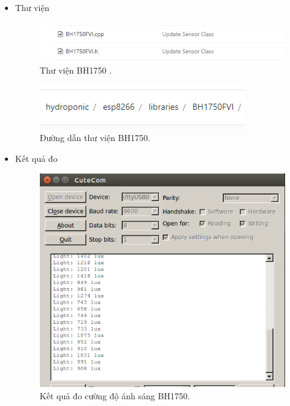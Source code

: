 \documentclass[a4paper,12pt,oneside]{article}
\begin{document}
\begin{enumerate}
\begin{itemize}
			\item Thư viện
			
			\begin{figure}[H]
			\centering
			\begin{center}
			\includegraphics[scale=.7]{hinh/lib_light.PNG}
			\end{center}
			\caption{Thư viện BH1750 .}
			\end{figure}
			
			\begin{figure}[H]
			\centering
			\begin{center}
			\includegraphics[scale=.7]{hinh/path_light.PNG}
			\end{center}
			\caption{Đường dẫn thư viện BH1750.}
			\end{figure}
			
			\item Kết quả đo
			
			\begin{figure}[H]
			\centering
			\begin{center}
			\includegraphics[scale=.6]{hinh/result_light.PNG}
			\end{center}
			\caption{Kết quả đo cường độ ánh sáng BH1750.}
			\end{figure}
		

\end{itemize}
\end{enumerate}
\end{document}
